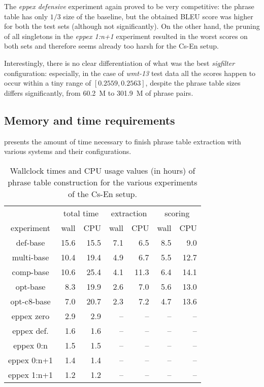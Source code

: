 The \emph{eppex defensive} experiment again proved to be very competitive:
the phrase table has only $1/3$ size of the baseline,
but the obtained BLEU score was higher for both the test sets (although not significantly).
On the other hand, the pruning of all singletons in the \emph{eppex 1:n+1} experiment
resulted in the worst scores on both sets and therefore seems already too harsh for
the Cs-En setup.

Interestingly, there is no clear differentiation of what was the best \emph{sigfilter}
configuration: especially, in the case of \emph{wmt-13} test data all the scores
happen to occur within a tiny range of $[0.2559, 0.2563]$, despite the phrase table sizes
differs significantly, from 60.2~M to 301.9~M of phrase pairs.

\subsection{Memory and time requirements}

 presents the amount of time necessary to finish
phrase table extraction with various systems and their configurations.

\begin{table}[ht]
\centering
\begin{tabular}{ | c | r r | r r | r r | }
\hline
 & \multicolumn{2}{|c|}{total time} & \multicolumn{2}{|c|}{extraction} & \multicolumn{2}{|c|}{scoring} \\
experiment & wall & CPU & wall & CPU & wall & CPU \\
\hline
\hline
def-base      & 15.6 & 15.5 & 7.1 & 6.5 & 8.5 & 9.0 \\
multi-base    & 10.4 & 19.4 & 4.9 & 6.7 & 5.5 & 12.7 \\
comp-base     & 10.6 & 25.4 & 4.1 & 11.3 & 6.4 & 14.1 \\
opt-base      & 8.3 & 19.9 & 2.6 & 7.0 & 5.6 & 13.0 \\
opt-c8-base   & 7.0 & 20.7 & 2.3 & 7.2 & 4.7 & 13.6 \\
eppex zero    & 2.9 & 2.9 & -- & -- & -- & -- \\
\hline
eppex def.    & 1.6 & 1.6 & -- & -- & -- & -- \\
eppex 0:n     & 1.5 & 1.5 & -- & -- & -- & -- \\
eppex 0:n+1   & 1.4 & 1.4 & -- & -- & -- & -- \\
eppex 1:n+1   & 1.2 & 1.2 & -- & -- & -- & -- \\
\hline
\end{tabular}
\caption{\label{cs-en-wmt13-time-benchmarks}
Wallclock times and CPU usage values (in hours) of phrase table
construction for the various experiments of the Cs-En setup.}
\end{table}

